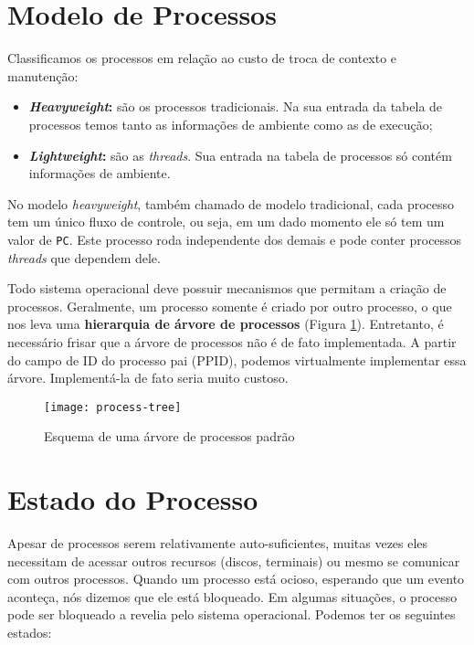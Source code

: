 \section{Modelo de Processos}
Classificamos os processos em relação ao custo de troca de contexto e manutenção:

\begin{itemize}
  \item \textbf{\textit{Heavyweight}:} são os processos tradicionais. Na sua entrada da tabela de processos temos tanto as informações de ambiente como as de execução;
  \item \textbf{\textit{Lightweight}:} são as \textit{threads}. Sua entrada na tabela de processos só contém informações de ambiente.
\end{itemize}

No modelo \textit{heavyweight}, também chamado de modelo tradicional, cada processo tem um único fluxo de controle, ou seja, em um dado momento ele só tem um valor de \texttt{PC}. Este processo roda independente dos demais e pode conter processos \textit{threads} que dependem dele.

Todo sistema operacional deve possuir mecanismos que permitam a criação de processos. Geralmente, um processo somente é criado por outro processo, o que nos leva uma \textbf{hierarquia de árvore de processos} (Figura \ref{fig:process-tree}). Entretanto, é necessário frisar que a árvore de processos não é de fato implementada. A partir do campo de ID do processo pai (PPID), podemos virtualmente implementar essa árvore. Implementá-la de fato seria muito custoso.

\begin{figure}[h]
  \centering
  \texttt{[image: process-tree]}
  \caption{Esquema de uma árvore de processos padrão}
  \label{fig:process-tree}
\end{figure}




















\section{Estado do Processo}
Apesar de processos serem relativamente auto-suficientes, muitas vezes eles necessitam de acessar outros recursos (discos, terminais) ou mesmo se comunicar com outros processos. Quando um processo está ocioso, esperando que um evento aconteça, nós dizemos que ele está bloqueado. Em algumas situações, o processo pode ser bloqueado a revelia pelo sistema operacional. Podemos ter os seguintes estados:


